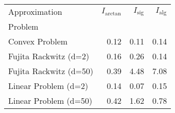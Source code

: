 \begin{tabular}{lrrr}
Approximation & $I_\text{arctan}$ & $I_\text{sig}$ & $I_\text{alg}$ \\
Problem &  &  &  \\
Convex Problem & 0.12 & 0.11 & 0.14 \\
Fujita Rackwitz (d=2) & 0.16 & 0.26 & 0.14 \\
Fujita Rackwitz (d=50) & 0.39 & 4.48 & 7.08 \\
Linear Problem (d=2) & 0.14 & 0.07 & 0.15 \\
Linear Problem (d=50) & 0.42 & 1.62 & 0.78 \\
\end{tabular}
